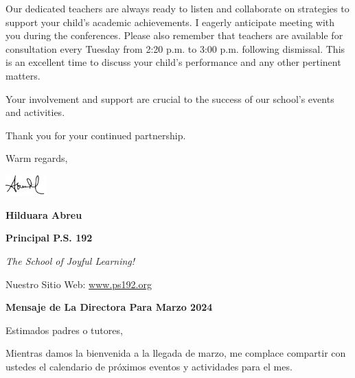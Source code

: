 \documentclass[12pt,letterpaper]{article}
\begin{document}
Our dedicated teachers are always ready to listen and collaborate on strategies to support your child’s academic achievements. I eagerly anticipate meeting with you during the conferences.
Please also remember that teachers are available for consultation every Tuesday from 2:20 p.m. to 3:00 p.m. following dismissal. This is an excellent time to discuss your child’s performance and any other pertinent matters.

Your involvement and support are crucial to the success of our school’s events and activities. 

Thank you for your continued partnership.

Warm regards, 

\includegraphics[width=0.12\textwidth]{hil_signature}

\textbf{Hilduara Abreu}

\textbf{Principal P.S. 192}

\textit{The School of Joyful Learning!}

\newpage
\vspace*{.5in}
Nuestro Sitio Web: \href{https://www.ps192.org}{www.ps192.org}

\textbf{Mensaje de La Directora Para Marzo 2024}

Estimados padres o tutores,

Mientras damos la bienvenida a la llegada de marzo, me complace compartir con ustedes el calendario de próximos eventos y actividades para el mes.
\end{document}
